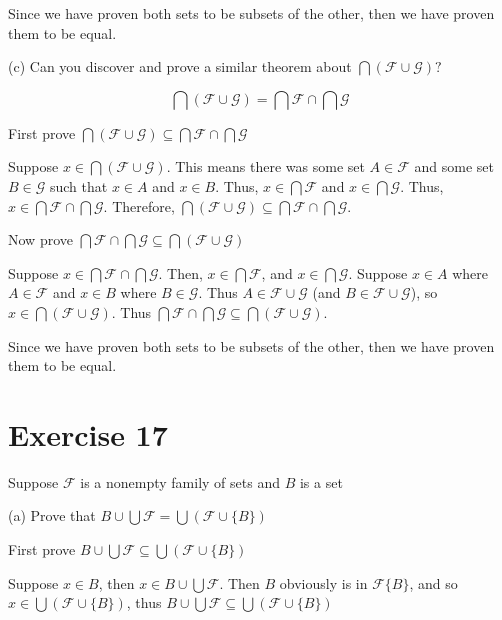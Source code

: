 \documentclass[11pt]{article}
\newcommand{\family}[1]{\mathcal{#1}}
\begin{document}
Since we have proven both sets to be subsets of the other, then we have proven 
them to be equal.

\noindent (c) Can you discover and prove a similar theorem about 
$\bigcap (\family{F} \cup \family{G})?$

$$\bigcap (\family{F} \cup \family{G}) = \bigcap \family{F} \cap \bigcap \family{G}$$

First prove $\bigcap (\family{F} \cup \family{G}) \subseteq \bigcap \family{F} \cap \bigcap \family{G}$

Suppose $x \in \bigcap (\family{F} \cup \family{G})$. This means there was some 
set $A \in \family{F}$ and some set $B \in \family{G}$ such that $x \in A$ and 
$x \in B$. Thus, $x \in \bigcap \family{F}$ and $x \in \bigcap \family{G}$.
Thus, $x \in \bigcap \family{F} \cap \bigcap \family{G}$. 
Therefore, $\bigcap (\family{F} \cup \family{G}) \subseteq \bigcap \family{F} \cap \bigcap \family{G}$.

Now prove $\bigcap \family{F} \cap \bigcap \family{G} \subseteq \bigcap (\family{F} \cup \family{G})$

Suppose $x \in \bigcap \family{F} \cap \bigcap \family{G}$. Then, 
$x \in \bigcap \family{F}$, and $x \in \bigcap \family{G}$. Suppose $x \in A$ 
where $A \in \family{F}$ and $x \in B$ where $B \in \family{G}$. Thus 
$A \in \family{F} \cup \family{G}$ (and $B \in \family{F} \cup \family{G}$), so 
$x \in \bigcap (\family{F} \cup \family{G})$. Thus 
$\bigcap \family{F} \cap \bigcap \family{G} \subseteq \bigcap (\family{F} \cup \family{G})$.

Since we have proven both sets to be subsets of the other, then we have proven 
them to be equal.

\section*{Exercise 17}

Suppose $\family{F}$ is a nonempty family of sets and $B$ is a set

\noindent (a) Prove that $B \cup \bigcup \family{F} = \bigcup (\family{F} \cup \{B\})$

First prove $B \cup \bigcup \family{F} \subseteq \bigcup (\family{F} \cup \{B\})$

Suppose $x \in B$, then $x \in B \cup \bigcup \family{F}$. Then $B$ obviously 
is in $\family{F} \{B\}$, and so $x \in \bigcup (\family{F} \cup \{B\})$, 
thus $B \cup \bigcup \family{F} \subseteq \bigcup (\family{F} \cup \{B\})$
\end{document}
